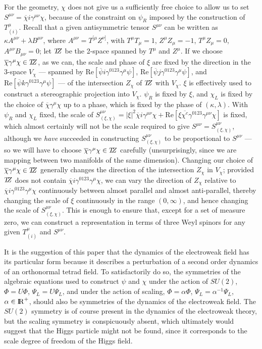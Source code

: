 \documentclass[a4paper,twocolumn,showpacs,preprintnumbers,aps]{revtex4}
\begin{document}
For the geometry, $\chi$ does not give us a sufficiently free choice to allow us to set
$S^{\mu\nu}=\overline{\chi}i\gamma^{\mu\nu}\chi$, because of the constraint on
$\psi_R$ imposed by the construction of $T^\mu_{(i)}$. Recall that a given
antisymmetric tensor $S^{\mu\nu}$ can be written as
$\kappa A^{\mu\nu}+\lambda B^{\mu\nu}$, where $A^{\mu\nu}=T^{[\mu}Z^{\nu]}$, with
$T^\mu T_\mu=1$, $Z^\mu Z_\mu=-1$, $T^\mu Z_\mu=0$, $A^{\mu\nu}B_{\mu\nu}=0$;
let ${T\hspace{-.35em}Z}$ be the 2-space spanned by $T^\mu$ and $Z^\mu$.
If we choose $\overline{\chi}\gamma^\mu\chi\in {T\hspace{-.35em}Z}$, as we can, the scale and phase of
$\xi$ are fixed by the direction in the 3-space $V_\chi$ --- spanned by
$\mathrm{Re}[\overline{\psi}i\gamma^{0123}\gamma^\mu\psi]$,
$\mathrm{Re}[\overline{\psi}j\gamma^{0123}\gamma^\mu\psi]$, and
$\mathrm{Re}[\overline{\psi}k\gamma^{0123}\gamma^\mu\psi]$ ---
of the intersection $Z_\chi$ of ${T\hspace{-.35em}Z}$ with $V_\chi$. $\xi$ is effectively used to construct a
stereographic projection into $V_\chi$. $\psi_R$ is fixed by $\xi$, and $\chi_L$ is
fixed by the choice of $\overline{\chi}\gamma^\mu\chi$ up to a phase, which is fixed by the
phase of $(\kappa,\lambda)$. With $\psi_R$ and $\chi_L$ fixed, the scale
of $S^{\mu\nu}_{(\xi,\chi)}=|\xi|^2\overline{\chi}i\gamma^{\mu\nu}\chi+
          \mathrm{Re}[\xi\overline{\chi^c}\gamma^{0123}\gamma^{\mu\nu}\chi]$
is fixed, which almost certainly will not be the scale required to give
$S^{\mu\nu}=S^{\mu\nu}_{(\xi,\chi)}$, although we \emph{have} succeeded in constructing
$S^{\mu\nu}_{(\xi,\chi)}$ to be proportional to $S^{\mu\nu}$ --- so we will have to choose
$\overline{\chi}\gamma^\mu\chi\in {T\hspace{-.35em}Z}$ carefully (unsurprisingly, since we are mapping
between two manifolds of the same dimension).
Changing our choice of $\overline{\chi}\gamma^\mu\chi\in {T\hspace{-.35em}Z}$ generally changes the
direction of the intersection $Z_\chi$ in $V_\chi$; provided ${T\hspace{-.35em}Z}$ does not contain
$\overline{\chi}i\gamma^{0123}\gamma^\mu\chi$, we can vary the direction of $Z_\chi$
relative to $\overline{\chi}i\gamma^{0123}\gamma^\mu\chi$ continuously between almost
parallel and almost anti-parallel, thereby changing the scale of $\xi$ continuously in the
range $(0,\infty)$, and hence changing the scale of $S^{\mu\nu}_{(\xi,\chi)}$. This is
enough to ensure that, except for a set of measure zero, we can construct a representation
in terms of three Weyl spinors for any given $T^\mu_{(i)}$ and $S^{\mu\nu}$.

It is the suggestion of this paper that the dynamics of the electroweak
field has its particular form because it describes a perturbation of a
second order dynamics of an orthonormal tetrad field. To satisfactorily do so, the
symmetries of the algebraic equations used to construct $\psi$ and $\chi$
under the action of $SU(2)$, $\Phi=U\Phi$, $\Psi_L=U\Psi_L$, and under
the action of scaling, $\Phi=\alpha\Phi$, $\Psi_L=\alpha^{-1}\Psi_L$,
$\alpha\in{\mathrm{I\hspace{-.2em}R}}^+$, should also be symmetries of the dynamics of the
electroweak field. The $SU(2)$ symmetry is of course present in the dynamics
of the electroweak theory, but the scaling symmetry is conspicuously absent,
which ultimately would suggest that the Higgs particle might not be found, since it
corresponds to the scale degree of freedom of the Higgs field.
\end{document}
